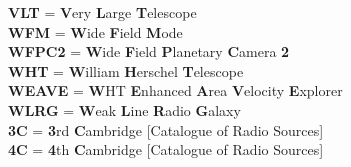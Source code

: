 {\textbf{VLT} = \textbf{V}ery \textbf{L}arge \textbf{T}elescope \\
\textbf{WFM} = \textbf{W}ide \textbf{F}ield \textbf{M}ode \\
\textbf{WFPC2} = \textbf{W}ide \textbf{F}ield \textbf{P}lanetary \textbf{C}amera \textbf{2} \\
\textbf{WHT} = \textbf{W}illiam \textbf{H}erschel \textbf{T}elescope \\
\textbf{WEAVE} = \textbf{W}HT \textbf{E}nhanced \textbf{A}rea \textbf{V}elocity \textbf{E}xplorer \\
\textbf{WLRG} = \textbf{W}eak \textbf{L}ine \textbf{R}adio \textbf{G}alaxy \\
\textbf{3C} = \textbf{3}rd \textbf{C}ambridge [Catalogue of Radio Sources] \\
\textbf{4C} = \textbf{4}th \textbf{C}ambridge [Catalogue of Radio Sources] \\

}
